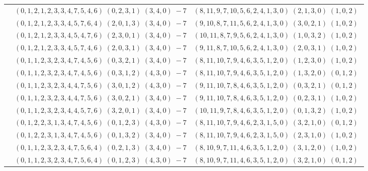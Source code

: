 \documentclass[11pt]{article}
\begin{document}
\begin{longtable}[l]{|c|c|c|}
 \cline{2-3} 
 & $(0 ,1 ,2 ,1 ,2 ,3 ,3 ,4 ,7 ,5 ,4 ,6) \;(0 ,2 ,3 ,1) \;(3 ,4 ,0) \;-7$ & $(8 ,11 ,9 ,7 ,10 ,5 ,6 ,2 ,4 ,1 ,3 ,0) \;(2 ,1 ,3 ,0) \;(1 ,0 ,2) \;$\\ 
 \cline{2-3} 
 & $(0 ,1 ,2 ,1 ,2 ,3 ,3 ,4 ,5 ,7 ,6 ,4) \;(2 ,0 ,1 ,3) \;(3 ,4 ,0) \;-7$ & $(9 ,10 ,8 ,7 ,11 ,5 ,6 ,2 ,4 ,1 ,3 ,0) \;(3 ,0 ,2 ,1) \;(1 ,0 ,2) \;$\\ 
 \cline{2-3} 
 & $(0 ,1 ,2 ,1 ,2 ,3 ,3 ,4 ,5 ,4 ,7 ,6) \;(2 ,3 ,0 ,1) \;(3 ,4 ,0) \;-7$ & $(10 ,11 ,8 ,7 ,9 ,5 ,6 ,2 ,4 ,1 ,3 ,0) \;(1 ,0 ,3 ,2) \;(1 ,0 ,2) \;$\\ 
 \cline{2-3} 
 & $(0 ,1 ,2 ,1 ,2 ,3 ,3 ,4 ,5 ,7 ,4 ,6) \;(2 ,0 ,3 ,1) \;(3 ,4 ,0) \;-7$ & $(9 ,11 ,8 ,7 ,10 ,5 ,6 ,2 ,4 ,1 ,3 ,0) \;(2 ,0 ,3 ,1) \;(1 ,0 ,2) \;$\\ 
 \cline{2-3} 
 & $(0 ,1 ,1 ,2 ,3 ,2 ,3 ,4 ,7 ,4 ,5 ,6) \;(0 ,3 ,2 ,1) \;(3 ,4 ,0) \;-7$ & $(8 ,11 ,10 ,7 ,9 ,4 ,6 ,3 ,5 ,1 ,2 ,0) \;(1 ,2 ,3 ,0) \;(1 ,0 ,2) \;$\\ 
 \cline{2-3} 
 & $(0 ,1 ,1 ,2 ,3 ,2 ,3 ,4 ,7 ,4 ,5 ,6) \;(0 ,3 ,1 ,2) \;(4 ,3 ,0) \;-7$ & $(8 ,11 ,10 ,7 ,9 ,4 ,6 ,3 ,5 ,1 ,2 ,0) \;(1 ,3 ,2 ,0) \;(0 ,1 ,2) \;$\\ 
 \cline{2-3} 
 & $(0 ,1 ,1 ,2 ,3 ,2 ,3 ,4 ,4 ,7 ,5 ,6) \;(3 ,0 ,1 ,2) \;(4 ,3 ,0) \;-7$ & $(9 ,11 ,10 ,7 ,8 ,4 ,6 ,3 ,5 ,1 ,2 ,0) \;(0 ,3 ,2 ,1) \;(0 ,1 ,2) \;$\\ 
 \cline{2-3} 
 & $(0 ,1 ,1 ,2 ,3 ,2 ,3 ,4 ,4 ,7 ,5 ,6) \;(3 ,0 ,2 ,1) \;(3 ,4 ,0) \;-7$ & $(9 ,11 ,10 ,7 ,8 ,4 ,6 ,3 ,5 ,1 ,2 ,0) \;(0 ,2 ,3 ,1) \;(1 ,0 ,2) \;$\\ 
 \cline{2-3} 
 & $(0 ,1 ,1 ,2 ,3 ,2 ,3 ,4 ,4 ,5 ,7 ,6) \;(3 ,2 ,0 ,1) \;(3 ,4 ,0) \;-7$ & $(10 ,11 ,9 ,7 ,8 ,4 ,6 ,3 ,5 ,1 ,2 ,0) \;(0 ,1 ,3 ,2) \;(1 ,0 ,2) \;$\\ 
 \cline{2-3} 
 & $(0 ,1 ,2 ,2 ,3 ,1 ,3 ,4 ,7 ,4 ,5 ,6) \;(0 ,1 ,2 ,3) \;(4 ,3 ,0) \;-7$ & $(8 ,11 ,10 ,7 ,9 ,4 ,6 ,2 ,3 ,1 ,5 ,0) \;(3 ,2 ,1 ,0) \;(0 ,1 ,2) \;$\\ 
 \cline{2-3} 
 & $(0 ,1 ,2 ,2 ,3 ,1 ,3 ,4 ,7 ,4 ,5 ,6) \;(0 ,1 ,3 ,2) \;(3 ,4 ,0) \;-7$ & $(8 ,11 ,10 ,7 ,9 ,4 ,6 ,2 ,3 ,1 ,5 ,0) \;(2 ,3 ,1 ,0) \;(1 ,0 ,2) \;$\\ 
 \cline{2-3} 
 & $(0 ,1 ,1 ,2 ,3 ,2 ,3 ,4 ,7 ,5 ,6 ,4) \;(0 ,2 ,1 ,3) \;(3 ,4 ,0) \;-7$ & $(8 ,10 ,9 ,7 ,11 ,4 ,6 ,3 ,5 ,1 ,2 ,0) \;(3 ,1 ,2 ,0) \;(1 ,0 ,2) \;$\\ 
 \cline{2-3} 
 & $(0 ,1 ,1 ,2 ,3 ,2 ,3 ,4 ,7 ,5 ,6 ,4) \;(0 ,1 ,2 ,3) \;(4 ,3 ,0) \;-7$ & $(8 ,10 ,9 ,7 ,11 ,4 ,6 ,3 ,5 ,1 ,2 ,0) \;(3 ,2 ,1 ,0) \;(0 ,1 ,2) \;$\\ 

\end{longtable}
\end{document}
